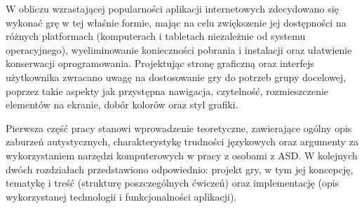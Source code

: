 W obliczu wzrastającej popularności aplikacji internetowych zdecydowano się wykonać grę w tej właśnie formie, mając na celu zwiększenie jej dostępności na różnych platformach (komputerach i tabletach niezależnie od systemu operacyjnego), wyeliminowanie konieczności pobrania i instalacji oraz ułatwienie konserwacji oprogramowania.
Projektując stronę graficzną oraz interfejs użytkownika zwracano uwagę na dostosowanie gry do potrzeb grupy docelowej, poprzez takie aspekty jak przystępna nawigacja, czytelność, rozmieszczenie elementów na ekranie, dobór kolorów oraz styl grafiki.

Pierwsza część pracy stanowi wprowadzenie teoretyczne, zawierające ogólny opis zaburzeń autystycznych, charakterystykę trudności językowych oraz argumenty za wykorzystaniem narzędzi komputerowych w pracy z osobami z ASD.
W kolejnych dwóch rozdziałach przedstawiono odpowiednio: projekt gry, w tym jej koncepcję, tematykę i treść (strukturę poszczególnych ćwiczeń) oraz implementację (opis wykorzystanej technologii i funkcjonalności aplikacji).


